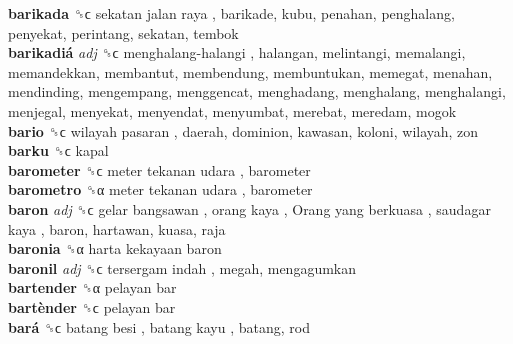 \textbf{barikada} ␝ϲ   sekatan jalan raya , barikade, kubu, penahan, penghalang, penyekat, perintang, sekatan, tembok  \\
\textbf{barikadiá} \emph{adj}  ␝ϲ   menghalang-halangi , halangan, melintangi, memalangi, memandekkan, membantut, membendung, membuntukan, memegat, menahan, mendinding, mengempang, menggencat, menghadang, menghalang, menghalangi, menjegal, menyekat, menyendat, menyumbat, merebat, meredam, mogok  \\
\textbf{bario} ␝ϲ   wilayah pasaran , daerah, dominion, kawasan, koloni, wilayah, zon  \\
\textbf{barku} ␝ϲ  kapal  \\
\textbf{barometer} ␝ϲ   meter tekanan udara , barometer  \\
\textbf{barometro} ␝α   meter tekanan udara , barometer  \\
\textbf{baron} \emph{adj}  ␝ϲ   gelar bangsawan ,  orang kaya ,  Orang yang berkuasa ,  saudagar kaya , baron, hartawan, kuasa, raja  \\
\textbf{baronia} ␝α   harta kekayaan baron   \\
\textbf{baronil} \emph{adj}  ␝ϲ   tersergam indah , megah, mengagumkan  \\
\textbf{bartender} ␝α   pelayan bar   \\
\textbf{bartènder} ␝ϲ   pelayan bar   \\
\textbf{bará} ␝ϲ   batang besi ,  batang kayu , batang, rod  \\
